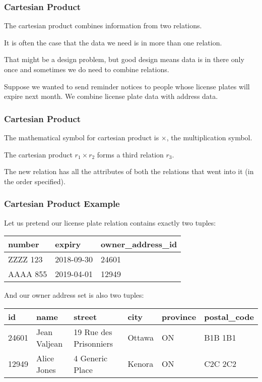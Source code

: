 \begin{frame}
\frametitle{Cartesian Product}

The \alert{cartesian product} combines information from two relations. 

It is often the case that the data we need is in more than one relation. 

That might be a design problem, but good design means data is in there only once and sometimes we do need to combine relations. 

Suppose we wanted to send reminder notices to people whose license plates will expire next month. We combine license plate data with address data. 

\end{frame}



\begin{frame}
\frametitle{Cartesian Product}


The mathematical symbol for cartesian product is $\times$, the multiplication symbol. 

The cartesian product $r_{1} \times r_{2}$ forms a third relation $r_{3}$.

 The new relation has all the attributes of both the relations that went into it (in the order specified). 

\end{frame}



\begin{frame}
\frametitle{Cartesian Product Example}

Let us pretend our license plate relation contains exactly two tuples:

{\small
\begin{center}
\begin{tabular}{|l|l|l|}\hline
	\textbf{number} & \textbf{expiry} & \textbf{owner\_address\_id} \\ \hline
	ZZZZ 123 & 2018-09-30 & 24601 \\ \hline
	AAAA 855 & 2019-04-01 & 12949 \\ \hline
\end{tabular}
\end{center}
}

And our owner address set is also two tuples: 

{\small
\begin{center}
	\begin{tabular}{|l|l|l|l|l|l|}\hline
		\textbf{id} & \textbf{name} &\textbf{street} & \textbf{city} & \textbf{province} & \textbf{postal\_code} \\ \hline
		24601 & Jean Valjean & 19 Rue des Prisonniers & Ottawa & ON & B1B 1B1\\ \hline
		12949 & Alice Jones & 4 Generic Place & Kenora & ON & C2C 2C2\\ \hline
	\end{tabular}
\end{center}
}


\end{frame}



